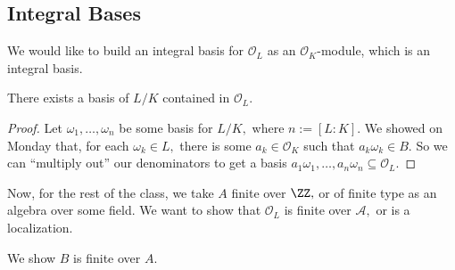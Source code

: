 \subsection{Integral Bases}
We would like to build an integral basis for $\mathcal O_L$ as an $\mathcal O_K$-module, which is an integral basis.
\begin{lem}
    There exists a basis of $L/K$ contained in $\mathcal O_L.$
\end{lem}
\begin{proof}
    Let $\omega_1,\ldots,\omega_n$ be some basis for $L/K,$ where $n:=[L:K].$ We showed on Monday that, for each $\omega_k\in L,$ there is some $a_k\in\mathcal O_K$ such that $a_k\omega_k\in B.$ So we can ``multiply out'' our denominators to get a basis $a_1\omega_1,\ldots,a_n\omega_n\subseteq\mathcal O_L.$
\end{proof}
Now, for the rest of the class, we take $A$ finite over $\ZZ,$ or of finite type as an algebra over some field. We want to show that $\mathcal O_L$ is finite over $\mathcal A,$ or is a localization.
\begin{thm}
    We show $B$ is finite over $A.$
\end{thm}
